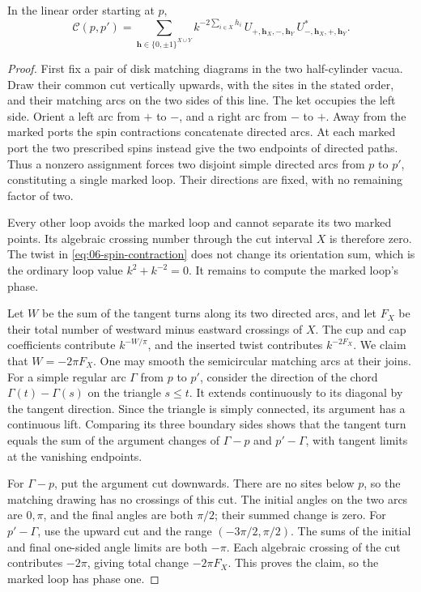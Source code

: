 \begin{lemma}
\label{lem:06-spin-contraction}
In the linear order starting at \(p\),
\begin{equation}
 \mathcal C(p,p')
 =
 \sum_{\mathbf h\in\{0,\pm1\}^{X\cup Y}}
 k^{-2\sum_{i\in X}h_i}\,
 U_{+,\mathbf h_X,-,\mathbf h_Y}\,
 U^*_{-,\mathbf h_X,+,\mathbf h_Y}.
 \label{eq:06-spin-contraction}
\end{equation}
\end{lemma}

\begin{proof}
First fix a pair of disk matching diagrams in the two half-cylinder
vacua.  Draw their common cut vertically upwards, with the sites in the
stated order, and their matching arcs on the two sides of this line.
The ket occupies the left side.  Orient a left arc from \(+\) to \(-\),
and a right arc from \(-\) to \(+\).
Away from the marked ports the spin contractions concatenate directed
arcs.  At each marked port the two prescribed spins instead give the
two endpoints of directed paths.  Thus a nonzero assignment forces two
disjoint simple directed arcs from \(p\) to \(p'\), constituting a
single marked loop.  Their directions are fixed, with no remaining
factor of two.

Every other loop avoids the marked loop and cannot separate its two
marked points.  Its algebraic crossing number through the cut interval
\(X\) is therefore zero.  The twist in
\eqref{eq:06-spin-contraction} does not change its orientation sum,
which is the ordinary loop value \(k^2+k^{-2}=0\).
It remains to compute the marked loop's phase.

Let \(W\) be the sum of the tangent turns along its two directed arcs,
and let \(F_X\) be their total number of westward minus eastward
crossings of \(X\).  The cup and cap coefficients contribute
\(k^{-W/\pi}\), and the inserted twist contributes \(k^{-2F_X}\).
We claim that \(W=-2\pi F_X\).
One may smooth the semicircular matching arcs at their joins.
For a simple regular arc \(\Gamma\) from \(p\) to \(p'\), consider the
direction of the chord \(\Gamma(t)-\Gamma(s)\) on the triangle \(s\le t\).
It extends continuously to its diagonal by the tangent direction.
Since the triangle is simply connected, its argument has a continuous
lift.  Comparing its three boundary sides shows that the tangent turn
equals the sum of the argument changes of
\(\Gamma-p\) and \(p'-\Gamma\), with tangent limits at the vanishing
endpoints.

For \(\Gamma-p\), put the argument cut downwards.  There are no sites
below \(p\), so the matching drawing has no crossings of this cut.
The initial angles on the two arcs are \(0,\pi\), and the final angles
are both \(\pi/2\); their summed change is zero.
For \(p'-\Gamma\), use the upward cut and the range
\((-3\pi/2,\pi/2)\).  The sums of the initial and final one-sided
angle limits are both \(-\pi\).  Each algebraic crossing of the cut
contributes \(-2\pi\), giving total change \(-2\pi F_X\).
This proves the claim, so the marked loop has phase one.


\end{proof}
